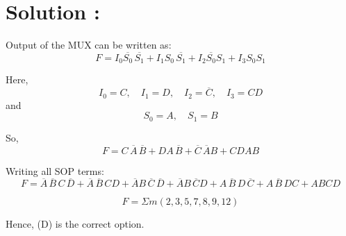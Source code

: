 \documentclass{article}
\begin{document}
\section*{\color{cyan} Solution :}

Output of the MUX can be written as:
\[
F = I_0 \overline{S_0} \, \overline{S_1} + I_1 S_0 \, \overline{S_1} + I_2 \overline{S_0} S_1 + I_3 S_0 S_1
\]

Here, \[
I_0 = C, \quad I_1 = D, \quad I_2 = \overline{C}, \quad I_3 = CD
\]
and \[
S_0 = A, \quad S_1 = B
\]

So,
\[
F = C \, \overline{A} \, \overline{B} + D A \, \overline{B} + \overline{C} \, \overline{A} B + CD A B
\]

Writing all SOP terms:
\[
F = \overline{A} \, \overline{B} \, C \, \overline{D} 
+ \overline{A} \, \overline{B} \, C D 
+ \overline{A} B \, \overline{C} \, \overline{D} 
+ \overline{A} B \, \overline{C} D 
+ A \, \overline{B} \, D \, \overline{C} 
+ A \, \overline{B} \, D C 
+ A B C D
\]

\[
F = \Sigma m(2, 3, 5, 7, 8, 9, 12)
\]

Hence, (D) is the correct option.
\end{document}
